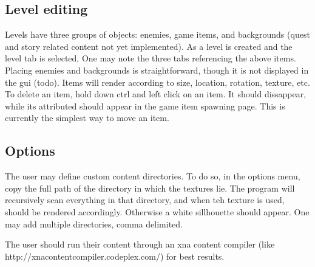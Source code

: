 \documentclass[letterpaper]{article}
\begin{document}
\subsection{Level editing}
Levels have three groups of objects: enemies, game items, and backgrounds (quest and story related content not yet implemented). As a level is created and the level tab is selected, One may note the three tabs referencing the above items. Placing enemies and backgrounds is straightforward, though it is not displayed in the gui (todo). Items will render according to size, location, rotation, texture, etc. To delete an item, hold down ctrl and left click on an item. It should dissappear, while its attributed should appear in the game item spawning page. This is currently the simplest way to move an item.

\subsection{Options}
The user may define custom content directories. To do so, in the options menu, copy the full path of the directory in which the textures lie. The program will recursively scan everything in that directory, and when teh texture is used, should be rendered accordingly. Otherwise a white sillhouette should appear. One may add multiple directories, comma delimited.

The user should run their content through an xna content compiler (like http://xnacontentcompiler.codeplex.com/) for best results.
\end{document}
